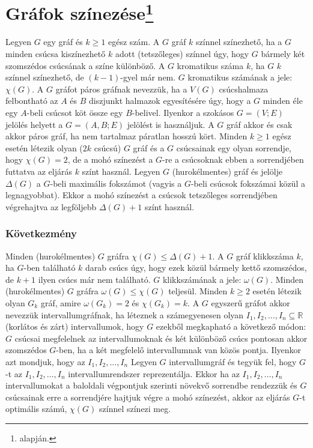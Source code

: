 \documentclass[12pt,a4paper,twoside]{report}
\begin{document}
\section{Gráfok színezése\protect\footnote{\cite{hj} alapján.}}
\df
Legyen $G$ egy gráf és $k\geq1$ egész szám. A $G$ gráf $k$ színnel színezhető, ha a $G$ minden csúcsa kiszínezhető $k$ adott (tetszőleges) színnel úgy, hogy $G$ bármely két szomszédos csúcsának a színe különböző. A $G$ kromatikus száma $k$, ha
$G$ $k$ színnel színezhető, de $(k - 1)$-gyel már nem. $G$ kromatikus számának a jele:
$\chi(G)$.
\df
A $G$ gráfot páros gráfnak nevezzük, ha a $V(G)$ csúcshalmaza felbontható az $A$ és $B$ diszjunkt halmazok egyesítésére úgy, hogy a $G$ minden éle egy
$A$-beli csúcsot köt össze egy $B$-belivel. Ilyenkor a szokásos $G = (V ; E)$ jelölés helyett a $G = (A, B; E)$ jelölést is használjuk.
\ttl
A $G$ gráf akkor és csak akkor páros gráf, ha nem tartalmaz páratlan
hosszú kört.
\al
Minden $k \geq 1$ egész esetén létezik olyan ($2k$ csúcsú) $G$ gráf és a $G$ csúcsainak egy olyan sorrendje, hogy $\chi(G) = 2$, de a mohó színezést a $G$-re a
csúcsoknak ebben a sorrendjében futtatva az eljárás $k$ színt használ.
\al
 Legyen $G$ (hurokélmentes) gráf és jelölje $\Delta(G)$ a $G$-beli maximális
fokszámot (vagyis a $G$-beli csúcsok fokszámai közül a legnagyobbat). Ekkor a mohó színezést a csúcsok tetszőleges sorrendjében végrehajtva az legföljebb $\Delta(G) + 1$
színt használ.
\subsubsection{Következmény}
 Minden (hurokélmentes) $G$ gráfra $\chi(G)\leq\Delta(G) + 1$.
\df
A $G$ gráf klikkszáma $k$, ha $G$-ben található $k$ darab csúcs úgy, hogy ezek közül bármely kettő szomszédos, de $k + 1$ ilyen csúcs már nem található.
$G$ klikkszámának a jele: $\omega(G)$.
\al 
Minden (hurokélmentes) $G$ gráfra $\omega(G) \leq \chi(G)$ teljesül.
\ttl
Minden $k\geq2$ esetén létezik olyan $G_k$ gráf, amire $\omega(G_k ) = 2$ és
$\chi(G_k ) = k$.
\df
A $G$ egyszerű gráfot akkor nevezzük intervallumgráfnak, ha léteznek a számegyenesen olyan $I_1 , I_2 ,\dots, I_n \subseteq \mathbb{R}$ (korlátos és zárt) intervallumok, hogy $G$ ezekből megkapható a következő módon: $G$ csúcsai megfelelnek az intervallumoknak és két különböző csúcs pontosan akkor szomszédos $G$-ben, ha a két megfelelő intervallumnak van közös pontja. Ilyenkor azt mondjuk, hogy az ${I_1,I_2 ,\dots, I_n }$
\ttl
 Legyen $G$ intervallumgráf és tegyük fel, hogy $G$-t az ${I_1 , I_2 ,\dots, I_n }$
intervallumrendszer reprezentálja. Ekkor ha az ${I_1 ,I_2,\dots, I_n }$ intervallumokat a baloldali végpontjuk szerinti növekvő sorrendbe rendezzük és $G$ csúcsainak erre a
sorrendjére hajtjuk végre a mohó színezést, akkor az eljárás $G$-t optimális számú,
$\chi(G)$ színnel színezi meg.
\end{document}
